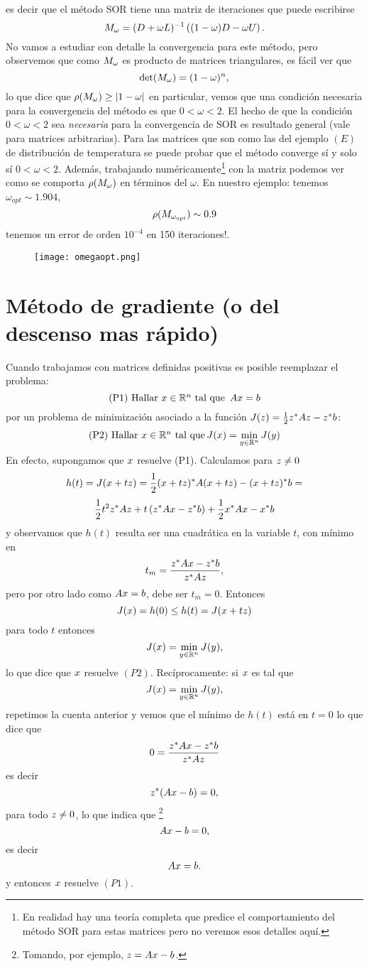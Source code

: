 es decir que el método SOR tiene una matriz de iteraciones que puede escribirse
$$
\Mb_\omega=(\Db+\omega \Lb)^{-1}\left((1-\omega)\Db-\omega\Ub\right).
$$
No vamos a estudiar con detalle la convergencia para este método, pero observemos que como $\Mb_\omega$ es producto de matrices triangulares, es fácil ver que  
$$
\det (\Mb_\omega)=(1-\omega)^n,
$$
lo que dice que 
$\rho(\Mb_\omega)\ge |1-\omega|$
en particular, vemos que una condición necesaria para la convergencia del  m\'etodo  es que $0<\omega<2$.
\tcc
El hecho de que la condición $0<\omega<2$ sea \emph{necesaria} para la convergencia de SOR es resultado general (vale para matrices arbitrarias). Para las matrices que son como las del ejemplo $(E)$ de distribución de temperatura se puede probar que el método converge sí y solo sí $0<\omega<2$. Además, trabajando numéricamente\footnote{En realidad hay una teoría completa que predice el comportamiento del método SOR para estas matrices pero no veremos esos detalles aquí.} con la matriz podemos ver como se comporta $\rho(\Mb_\omega)$ en términos del $\omega$. En nuestro ejemplo:
tenemos $\omega_{opt}\sim 1.904$,
$$
\rho(\Mb_{\omega_{opt}})\sim 0.9
$$
tenemos un error de orden $10^{-4}$ en 150 iteraciones!.
\etcc

\begin{figure}[h]
\centering\texttt{[image: omegaopt.png]}
\end{figure}

\section{Método de gradiente (o del descenso mas rápido)}

Cuando trabajamos con matrices definidas positivas es posible reemplazar el problema:
$$
\mbox{(P1) Hallar $\xb\in \R^n$ tal que
}\,\Ab\xb=\bb
$$
por un problema de minimización  asociado a la función $J(\zb)=\frac{1}{2}\zb^*\Ab\zb-\zb^*\bb$:
$$
\mbox{(P2) Hallar $\xb\in \Rn$ tal que}\, J(\xb)=
\min_{\yb\in \R^n}J(\yb)
$$
En efecto, supongamos que $\xb$ resuelve (P1). Calculamos para $\zb\ne\cero$
$$
h(t)=J(\xb+t\zb)= \frac{1}{2}(\xb+t\zb)^*\Ab(\xb+t\zb)-(\xb+t\zb)^*\bb=
$$
$$
\frac{1}{2}t^2\zb^*\Ab\zb+t\left(\zb^*\Ab\xb-\zb^*\bb\right) +\frac{1}{2}\xb^*\Ab\xb-\xb^*\bb
$$
y observamos que $h(t)$ resulta ser una cuadr\'atica en la variable $t$, con mínimo en
$$
t_m=\frac{\zb^*\Ab\xb-\zb^*\bb}{\zb^*\Ab\zb},
$$
pero por otro lado como $\Ab\xb=\bb$, debe ser $t_m=0$. Entonces
$$
J(\xb)=h(0)\le h(t)=J(\xb+t\zb)
$$
para todo $t$ entonces
$$
J(\xb)=\min_{\yb\in\Rn}J(\yb),
$$
lo que dice que $\xb$ resuelve $(P2)$.
Recíprocamente: si $\xb$ es tal que 
$$
J(\xb)=\min_{\yb\in\Rn}J(\yb),
$$
repetimos la cuenta anterior y vemos que el mínimo de $h(t)$ está en $t=0$ lo que dice que
$$0=\frac{\zb^*\Ab\xb-\zb^*\bb}{\zb^*\Ab\zb}
$$
es decir
$$
\zb^*(\Ab\xb-\bb)=0,
$$
para todo $\zb\neq \cero$, lo que indica que \footnote{Tomando, por ejemplo, $\zb=\Ab\xb-\bb$.}
$$
\Ab\xb-\bb=\cero,
$$
es decir
$$
\Ab\xb=\bb.
 $$
 y entonces $\xb$ resuelve $(P1)$.

